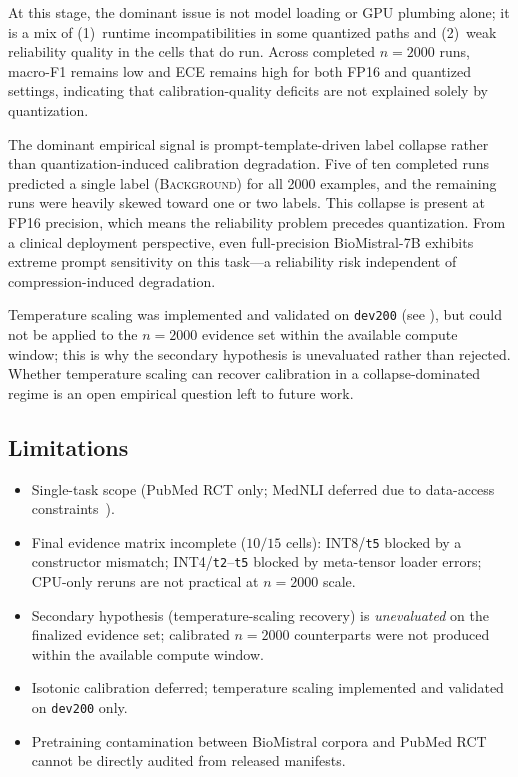 \documentclass[conference]{IEEEtran}
\begin{document}
At this stage, the dominant issue is not model loading or GPU plumbing alone; it is a mix of (1)~runtime incompatibilities in some quantized paths and (2)~weak reliability quality in the cells that do run.
Across completed $n=2000$ runs, macro-F1 remains low and ECE remains high for both FP16 and quantized settings, indicating that calibration-quality deficits are not explained solely by quantization.

The dominant empirical signal is prompt-template-driven label collapse rather than quantization-induced calibration degradation.
Five of ten completed runs predicted a single label (\textsc{Background}) for all 2000 examples, and the remaining runs were heavily skewed toward one or two labels.
This collapse is present at FP16 precision, which means the reliability problem precedes quantization.
From a clinical deployment perspective, even full-precision BioMistral-7B exhibits extreme prompt sensitivity on this task---a reliability risk independent of compression-induced degradation.

Temperature scaling was implemented and validated on \texttt{dev200} (see ), but could not be applied to the $n=2000$ evidence set within the available compute window; this is why the secondary hypothesis is unevaluated rather than rejected.
Whether temperature scaling can recover calibration in a collapse-dominated regime is an open empirical question left to future work.

\subsection{Limitations}
\begin{itemize}
  \item Single-task scope (PubMed RCT only; MedNLI deferred due to data-access constraints~\cite{romanov2018}).
  \item Final evidence matrix incomplete ($10/15$ cells): INT8/\texttt{t5} blocked by a constructor mismatch; INT4/\texttt{t2}--\texttt{t5} blocked by meta-tensor loader errors; CPU-only reruns are not practical at $n{=}2000$ scale.
  \item Secondary hypothesis (temperature-scaling recovery) is \emph{unevaluated} on the finalized evidence set; calibrated $n{=}2000$ counterparts were not produced within the available compute window.
  \item Isotonic calibration deferred; temperature scaling implemented and validated on \texttt{dev200} only.
  \item Pretraining contamination between BioMistral corpora and PubMed RCT cannot be directly audited from released manifests.
\end{itemize}
\end{document}
